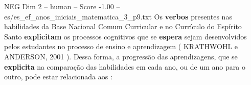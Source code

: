 \begin{textsample}{NEG Dim 2 – human – Score -1.00 – es/es\_ef\_anos\_iniciais\_matematica\_3\_p9.txt}  \label{ex:f2_neg_019}
Os \textbf{verbos} presentes nas habilidades da Base Nacional Comum Curricular e no Currículo do Espírito Santo \textbf{explicitam} os processos cognitivos que se \textbf{espera} sejam desenvolvidos pelos estudantes no processo de ensino e aprendizagem ( KRATHWOHL e ANDERSON, 2001 ).
Dessa forma, a progressão das aprendizagens, que se \textbf{explicita} na comparação das habilidades em cada ano, ou de um ano para o outro, pode estar relacionada aos :

\end{textsample}
